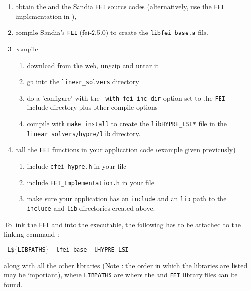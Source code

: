 \begin{enumerate}

\item obtain the \hypre{} and the Sandia {\tt FEI} source codes (alternatively, use
      the {\tt FEI} implementation in \hypre{}),
\item compile Sandia's {\tt FEI} (fei-2.5.0) to create the
      {\tt libfei\_base.a} file.
\item compile \hypre{} 
\begin{enumerate}
\item download \hypre{} from the web, ungzip and untar it
\item go into the {\tt linear\_solvers} directory
\item do a 'configure' with the {\tt --with-fei-inc-dir} option set to
      the {\tt FEI} include directory plus other compile options
\item compile with {\tt make install} to create the
      {\tt libHYPRE\_LSI*} file in the {\tt linear\_solvers/hypre/lib}
      directory.
\end{enumerate}
\item call the {\tt FEI} functions in your application code (example given
      previously)
\begin{enumerate}
\item include {\tt cfei-hypre.h} in your file 
\item include {\tt FEI\_Implementation.h} in your file 
\item make sure your application has an {\tt include} and an {\tt lib} path 
      to the {\tt include} and {\tt lib} directories created above. 
\end{enumerate}

\end{enumerate}


To link the {\tt FEI} and \hypre{} into the executable, the following has to be
attached to the linking command :

\begin{tabbing}
\hspace{0.5in} \= {\tt -L\$$\{$LIBPATHS$\}$ -lfei\_base -lHYPRE\_LSI} 
\end{tabbing}
along with all the other libraries (Note : the order in which the libraries are
listed may be important), where {\tt LIBPATHS} are where 
the \hypre{} and {\tt FEI} library files can be found.  


